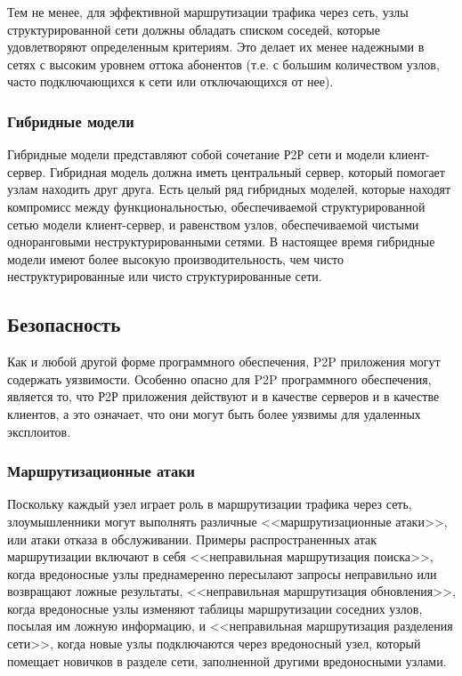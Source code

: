 \documentclass[bachelor, och, coursework]{SCWorks}
\begin{document}
Тем не менее, для эффективной маршрутизации трафика через сеть, узлы структурированной сети должны обладать списком соседей, которые удовлетворяют определенным критериям. Это делает их менее надежными в сетях с высоким уровнем оттока абонентов (т.е. с большим количеством узлов, часто подключающихся к сети или отключающихся от нее).

\subsubsection{Гибридные модели}
Гибридные модели представляют собой сочетание Р2Р сети и модели клиент-сервер. Гибридная модель должна иметь центральный сервер, который помогает узлам находить друг друга. Есть целый ряд гибридных моделей, которые находят компромисс между функциональностью, обеспечиваемой структурированной сетью модели клиент-сервер, и равенством узлов, обеспечиваемой чистыми одноранговыми неструктурированными сетями. В настоящее время гибридные модели имеют более высокую производительность, чем чисто неструктурированные или чисто структурированные сети.

\subsection{Безопасность}
Как и любой другой форме программного обеспечения, P2P приложения могут содержать уязвимости. Особенно опасно для P2P программного обеспечения, является то, что Р2Р приложения действуют и в качестве серверов и в качестве клиентов, а это означает, что они могут быть более уязвимы для удаленных эксплоитов.

\subsubsection{Маршрутизационные атаки}
Поскольку каждый узел играет роль в маршрутизации трафика через сеть, злоумышленники могут выполнять различные <<маршрутизационные атаки>>, или атаки отказа в обслуживании. Примеры распространенных атак маршрутизации включают в себя <<неправильная маршрутизация поиска>>, когда вредоносные узлы преднамеренно пересылают запросы неправильно или возвращают ложные результаты, <<неправильная маршрутизация обновления>>, когда вредоносные узлы изменяют таблицы маршрутизации соседних узлов, посылая им ложную информацию, и <<неправильная маршрутизация разделения сети>>, когда новые узлы подключаются через вредоносный узел, который помещает новичков в разделе сети, заполненной другими вредоносными узлами.
\end{document}
